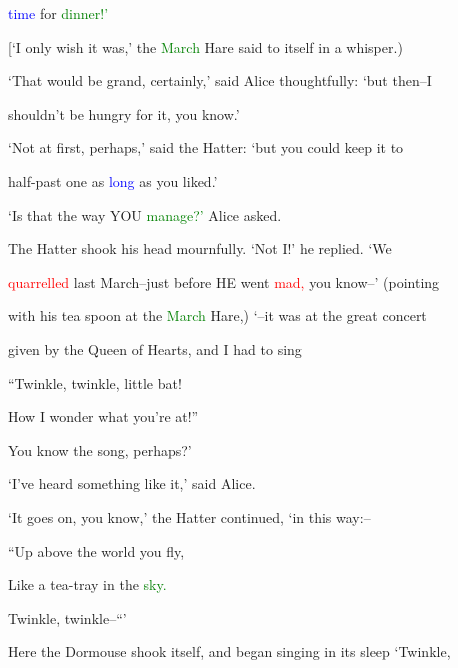  \textcolor{blue}{time} for \textcolor{green}{dinner!’}



 [‘I only wish it was,’ the \textcolor{green}{March} Hare said to itself in a whisper.)



 ‘That would be grand, certainly,’ said Alice thoughtfully: ‘but then--I

 shouldn’t be \textcolor{BurntOrange}{hungry} for it, you know.’



 ‘Not at first, perhaps,’ said the Hatter: ‘but you could keep it to

 half-past one as \textcolor{blue}{long} as you liked.’



 ‘Is that the way YOU \textcolor{green}{manage?’} Alice asked.



 The Hatter shook his head mournfully. ‘Not I!’ he replied. ‘We

 \textcolor{red}{quarrelled} last March--just before HE went \textcolor{red}{mad,} you know--’ (pointing

 with his tea spoon at the \textcolor{green}{March} Hare,) ‘--it was at the great concert

 given by the Queen of Hearts, and I had to \textcolor{BurntOrange}{sing}



 \textcolor{BurntOrange}{“Twinkle,} \textcolor{BurntOrange}{twinkle,} little bat!

 How I wonder what you’re at!”



 You know the song, perhaps?’



 ‘I’ve heard something like it,’ said Alice.



 ‘It goes on, you know,’ the Hatter continued, ‘in this way:--



 “Up above the world you fly,

 Like a tea-tray in the \textcolor{green}{sky.}

 \textcolor{BurntOrange}{Twinkle,} \textcolor{BurntOrange}{twinkle--“’}



 Here the Dormouse shook itself, and began \textcolor{BurntOrange}{singing} in its sleep \textcolor{BurntOrange}{‘Twinkle,}

